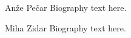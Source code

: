 \documentclass[journal]{IEEEtran/IEEEtran}
\begin{document}
% 
\newpage

\begin{IEEEbiography}{Anže Pečar}
Biography text here.
\end{IEEEbiography}

\begin{IEEEbiography}{Miha Zidar}
Biography text here.
\end{IEEEbiography}



\end{document}
